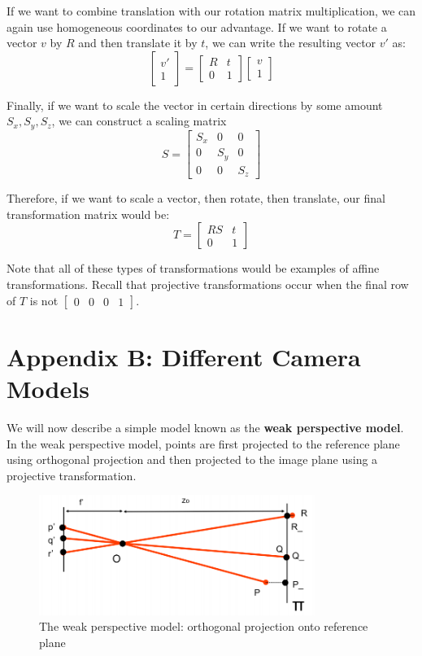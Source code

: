 \documentclass[a4paper, 12pt]{article}
\renewcommand\emph{\textbf}
\begin{document}
If we want to combine translation with our rotation matrix multiplication, we can again use homogeneous coordinates to our advantage. If we want to rotate a vector $v$ by $R$ and then translate it by $t$, we can write the resulting vector $v'$ as:
\[ \begin{bmatrix}v'\\1\end{bmatrix} = \begin{bmatrix}
R & t \\ 0 & 1
\end{bmatrix}\begin{bmatrix}
v \\ 1
\end{bmatrix}\]

Finally, if we want to scale the vector in certain directions by some amount $S_x, S_y, S_z$, we can construct a scaling matrix 
\[S = \begin{bmatrix}
S_x & 0 & 0 \\ 0 & S_y & 0 \\ 0 & 0 & S_z
\end{bmatrix}\]

Therefore, if we want to scale a vector, then rotate, then translate, our final transformation matrix would be:
\[T = \begin{bmatrix}
RS & t \\ 0 & 1
\end{bmatrix}\]

Note that all of these types of transformations would be examples of affine transformations. Recall that projective transformations occur when the final row of $T$ is not $\begin{bmatrix}
0 & 0 &0 &1
\end{bmatrix}$.

\section{Appendix B: Different Camera Models}
We will now describe a simple model known as the \emph{weak perspective model}. In the weak perspective model, points are first projected to the reference plane using orthogonal projection and then projected to the image plane using a projective transformation.
\begin{figure}[h!]
\centering
\includegraphics[width=0.8\textwidth]{figures/weak_perspective.png}
\caption{The weak perspective model: orthogonal projection onto reference plane}
\label{fig:weak_perspective}
\end{figure}
\end{document}
